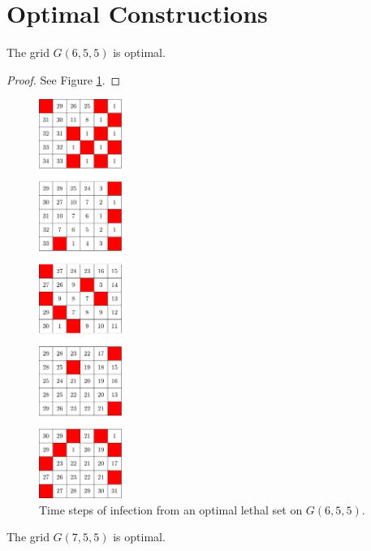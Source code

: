 \newpage

\section{Optimal Constructions}

\begin{con}
\label{con:6x5x5}
The grid $G(6,5,5)$ is optimal.
\end{con}

\begin{proof}
See Figure \ref{fig:6x5x5_numbered_heatmap}.
\end{proof}

\begin{figure}[H]
\centering
\includegraphics[width=0.24\textwidth]{figures/A/6x5x5_numbered_heatmap.pdf}
\caption{Time steps of infection from an optimal lethal set on $G(6,5,5)$.}
\label{fig:6x5x5_numbered_heatmap}
\end{figure}

\newpage

\begin{con}
\label{con:7x5x5}
The grid $G(7,5,5)$ is optimal.
\end{con}

